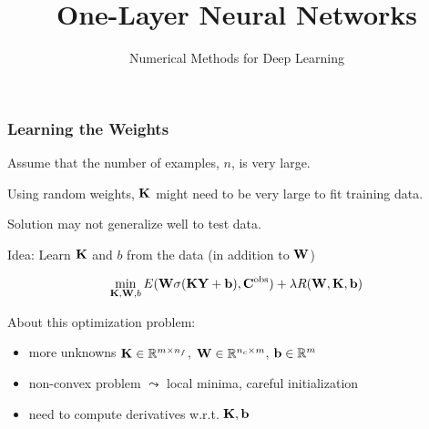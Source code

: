 \documentclass[12pt,fleqn,handout]{beamer}
\title{ One-Layer Neural Networks}
\subtitle{Numerical Methods for Deep Learning}
\date{
}
\begin{document}
\makebeamertitle



\begin{frame}[fragile]\frametitle{Learning the Weights}

Assume that the number of examples, $n$, is very large.

Using random weights, ${\bf K}$ might need to be very large to fit training data.

Solution may not generalize well to test data.

\bigskip
\pause

Idea: Learn ${\bf K}$ and $b$  from the data (in addition to ${\bf W}$)

$$ \min_{{\bf K},{\bf W},b} E({\bf W}\sigma({\bf K} {\bf Y} + {\bf b}), {\bf C}^{\rm obs}) + \lambda R({\bf W},{\bf K},{\bf b})$$

About this optimization problem:
\begin{itemize}
	\item more unknowns ${\bf K} \in \mathbb{R}^{m \times n_f}$, ${\bf W} \in \mathbb{R}^{n_c \times m}$, ${\bf b} \in \mathbb{R}^m$
	\item  non-convex problem $\leadsto$ local minima, careful initialization
	\item need to compute derivatives w.r.t. ${\bf K}, {\bf b}$
\end{itemize}


\end{frame}
\end{document}
